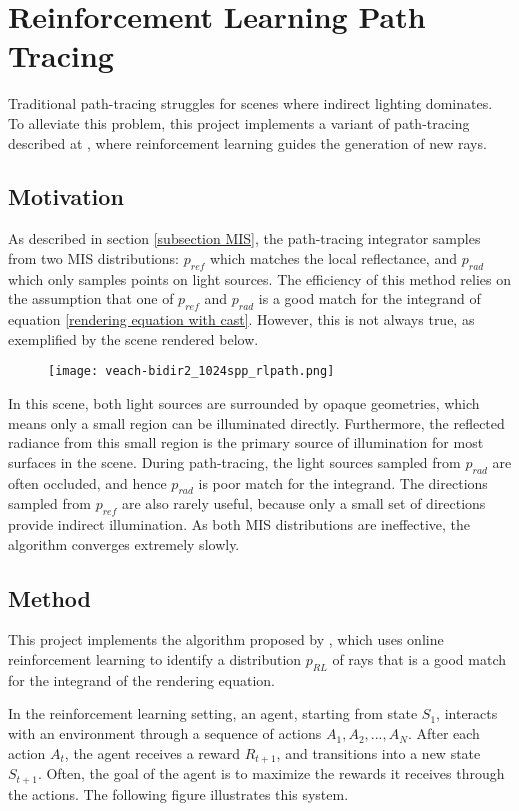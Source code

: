 \chapter{Reinforcement Learning Path Tracing}
\label{chapter RL}
Traditional path-tracing struggles for scenes where indirect lighting dominates. To alleviate this problem, this project implements a variant of path-tracing described at \cite{RLPT}, where reinforcement learning guides the generation of new rays.

\section{Motivation}
As described in section \ref{subsection MIS}, the path-tracing integrator samples from two MIS distributions: $p_{ref}$ which matches the local reflectance, and $p_{rad}$ which only samples points on light sources. The efficiency of this method relies on the assumption that one of $p_{ref}$ and $p_{rad}$ is a good match for the integrand of equation \ref{rendering equation with cast}. However, this is not always true, as exemplified by the scene rendered below.

\begin{figure}[H]
    \centering
    \texttt{[image: veach-bidir2\_1024spp\_rlpath.png]}
\end{figure}

In this scene, both light sources are surrounded by opaque geometries, which means only a small region can be illuminated directly. Furthermore, the reflected radiance from this small region is the primary source of illumination for most surfaces in the scene. During path-tracing, the light sources sampled from $p_{rad}$ are often occluded, and hence $p_{rad}$ is poor match for the integrand. The directions sampled from $p_{ref}$ are also rarely useful, because only a small set of directions provide indirect illumination. As both MIS distributions are ineffective, the algorithm converges extremely slowly.

\section{Method}
This project implements the algorithm proposed by \cite{RLPT}, which uses online reinforcement learning to identify a distribution $p_{RL}$ of rays that is a good match for the integrand of the rendering equation.

In the reinforcement learning setting, an agent, starting from state $S_1$, interacts with an environment through a sequence of actions $A_1,A_2,...,A_N$. After each action $A_t$, the agent receives a reward $R_{t+1}$, and transitions into a new state $S_{t+1}$. Often, the goal of the agent is to maximize the rewards it receives through the actions. The following figure illustrates this system.

